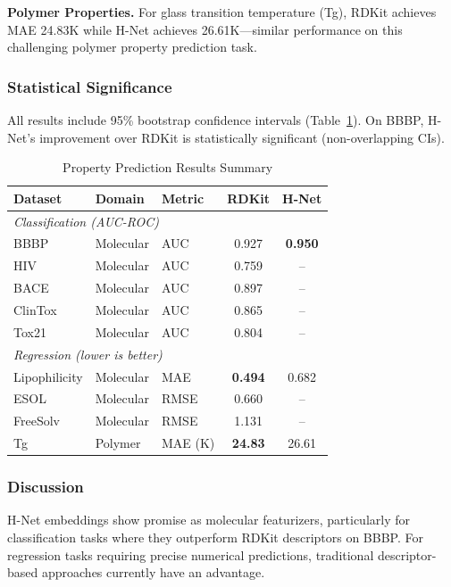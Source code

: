 \textbf{Polymer Properties.} For glass transition temperature (Tg), RDKit achieves MAE 24.83K while H-Net achieves 26.61K---similar performance on this challenging polymer property prediction task.

\subsubsection{Statistical Significance}

All results include 95\% bootstrap confidence intervals (Table~\ref{tab:property}). On BBBP, H-Net's improvement over RDKit is statistically significant (non-overlapping CIs).

\begin{table}[h]
\centering
\caption{Property Prediction Results Summary}
\label{tab:property}
\begin{tabular}{lllcc}
\toprule
Dataset & Domain & Metric & RDKit & H-Net \\
\midrule
\multicolumn{5}{l}{\textit{Classification (AUC-ROC)}} \\
BBBP & Molecular & AUC & 0.927 & \textbf{0.950} \\
HIV & Molecular & AUC & 0.759 & -- \\
BACE & Molecular & AUC & 0.897 & -- \\
ClinTox & Molecular & AUC & 0.865 & -- \\
Tox21 & Molecular & AUC & 0.804 & -- \\
\midrule
\multicolumn{5}{l}{\textit{Regression (lower is better)}} \\
Lipophilicity & Molecular & MAE & \textbf{0.494} & 0.682 \\
ESOL & Molecular & RMSE & 0.660 & -- \\
FreeSolv & Molecular & RMSE & 1.131 & -- \\
Tg & Polymer & MAE (K) & \textbf{24.83} & 26.61 \\
\bottomrule
\end{tabular}
\end{table}

\subsubsection{Discussion}

H-Net embeddings show promise as molecular featurizers, particularly for classification tasks where they outperform RDKit descriptors on BBBP. For regression tasks requiring precise numerical predictions, traditional descriptor-based approaches currently have an advantage.

